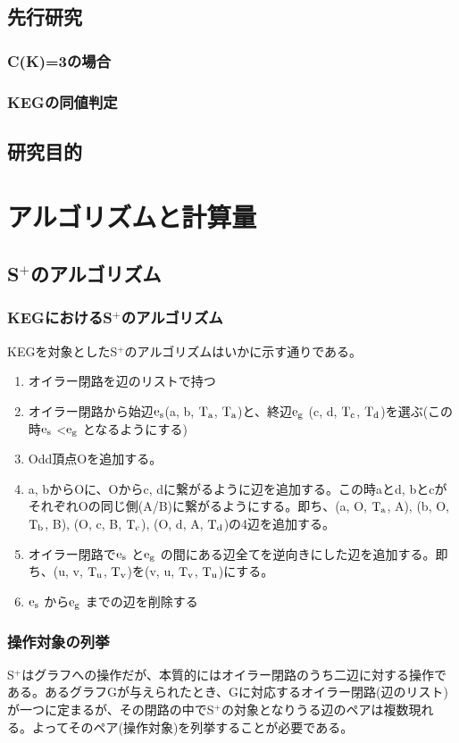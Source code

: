 \documentclass[11pt,a4j]{jsreport}
\newcommand{\splus}{S${}^\text{+}$}
\newcommand{\fl}[1]{$\rm{#1}$}
\begin{document}
\section{先行研究}
\subsection{C(K)=3の場合}
\subsection{KEGの同値判定}

\section{研究目的}

\chapter{アルゴリズムと計算量}

\section{\splus のアルゴリズム}
\subsection{KEGにおける\splus のアルゴリズム}
KEGを対象とした\splus のアルゴリズムはいかに示す通りである。
\begin{enumerate}
    \item オイラー閉路を辺のリストで持つ
    \item オイラー閉路から始辺\fl{e_s}(a, b, \fl{T_a}, \fl{T_a})と、終辺\fl{e_g} (c, d, \fl{T_c}, \fl{T_d})を選ぶ(この時\fl{e_s} <\fl{e_g} となるようにする)
    \item Odd頂点Oを追加する。
    \item a, bからOに、Oからc, dに繋がるように辺を追加する。この時aとd, bとcがそれぞれOの同じ側(A/B)に繋がるようにする。即ち、(a, O, \fl{T_a}, A), (b, O, \fl{T_b}, B), (O, c, B, \fl{T_c}), (O, d, A, \fl{T_d})の4辺を追加する。
    \item オイラー閉路で\fl{e_s} と\fl{e_g} の間にある辺全てを逆向きにした辺を追加する。即ち、(u, v, \fl{T_u}, \fl{T_v})を(v, u, \fl{T_v}, \fl{T_u})にする。
    \item \fl{e_s} から\fl{e_g} までの辺を削除する
\end{enumerate}

\subsection{操作対象の列挙}
\splus はグラフへの操作だが、本質的にはオイラー閉路のうち二辺に対する操作である。あるグラフGが与えられたとき、Gに対応するオイラー閉路(辺のリスト)が一つに定まるが、その閉路の中で\splus の対象となりうる辺のペアは複数現れる。よってそのペア(操作対象)を列挙することが必要である。
\end{document}

